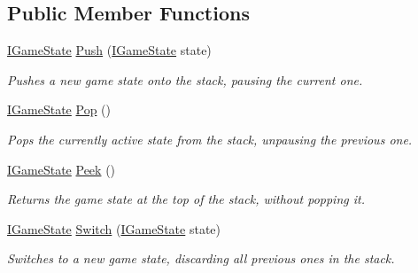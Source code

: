 \subsection*{Public Member Functions}
\begin{DoxyCompactItemize}
\item 
\hyperlink{interface_tri_devs_1_1_tri_engine_1_1_state_management_1_1_i_game_state}{I\-Game\-State} \hyperlink{interface_tri_devs_1_1_tri_engine_1_1_state_management_1_1_i_game_state_manager_af5fd6a8ef82488fe9d5e50f427a54c11}{Push} (\hyperlink{interface_tri_devs_1_1_tri_engine_1_1_state_management_1_1_i_game_state}{I\-Game\-State} state)
\begin{DoxyCompactList}\small\item\em Pushes a new game state onto the stack, pausing the current one. \end{DoxyCompactList}\item 
\hyperlink{interface_tri_devs_1_1_tri_engine_1_1_state_management_1_1_i_game_state}{I\-Game\-State} \hyperlink{interface_tri_devs_1_1_tri_engine_1_1_state_management_1_1_i_game_state_manager_a1fb036fc049f2b43aee01ed0fa38d2c6}{Pop} ()
\begin{DoxyCompactList}\small\item\em Pops the currently active state from the stack, unpausing the previous one. \end{DoxyCompactList}\item 
\hyperlink{interface_tri_devs_1_1_tri_engine_1_1_state_management_1_1_i_game_state}{I\-Game\-State} \hyperlink{interface_tri_devs_1_1_tri_engine_1_1_state_management_1_1_i_game_state_manager_aab323a4b1a4f624ae769b4e6715f5605}{Peek} ()
\begin{DoxyCompactList}\small\item\em Returns the game state at the top of the stack, without popping it. \end{DoxyCompactList}\item 
\hyperlink{interface_tri_devs_1_1_tri_engine_1_1_state_management_1_1_i_game_state}{I\-Game\-State} \hyperlink{interface_tri_devs_1_1_tri_engine_1_1_state_management_1_1_i_game_state_manager_a043263b33eb0474d7d7f2da0f2d52afa}{Switch} (\hyperlink{interface_tri_devs_1_1_tri_engine_1_1_state_management_1_1_i_game_state}{I\-Game\-State} state)
\begin{DoxyCompactList}\small\item\em Switches to a new game state, discarding all previous ones in the stack. \end{DoxyCompactList}\end{DoxyCompactItemize}

